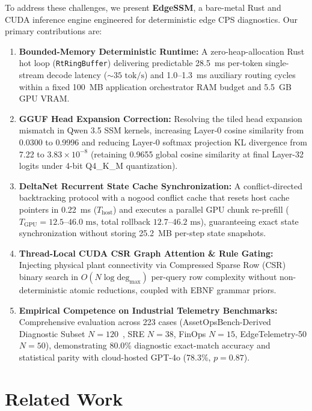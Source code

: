 \documentclass[journal]{IEEEtran}
\begin{document}
To address these challenges, we present \textbf{EdgeSSM}, a bare-metal Rust and CUDA inference engine engineered for deterministic edge CPS diagnostics. Our primary contributions are:
\begin{enumerate}
    \item \textbf{Bounded-Memory Deterministic Runtime:} A zero-heap-allocation Rust hot loop (\texttt{RtRingBuffer}) delivering predictable 28.5~ms per-token single-stream decode latency ($\sim 35\text{ tok/s}$) and 1.0--1.3~ms auxiliary routing cycles within a fixed 100~MB application orchestrator RAM budget and 5.5~GB GPU VRAM.
    \item \textbf{GGUF Head Expansion Correction:} Resolving the tiled head expansion mismatch in Qwen 3.5 SSM kernels, increasing Layer-0 cosine similarity from 0.0300 to 0.9996 and reducing Layer-0 softmax projection KL divergence from 7.22 to $3.83 \times 10^{-8}$ (retaining 0.9655 global cosine similarity at final Layer-32 logits under 4-bit Q4\_K\_M quantization).
    \item \textbf{DeltaNet Recurrent State Cache Synchronization:} A conflict-directed backtracking protocol with a nogood conflict cache that resets host cache pointers in 0.22~ms ($T_{\text{host}}$) and executes a parallel GPU chunk re-prefill ($T_{\text{GPU}} = 12.5\text{--}46.0\text{ ms}$, total rollback $12.7\text{--}46.2\text{ ms}$), guaranteeing exact state synchronization without storing 25.2~MB per-step state snapshots.
    \item \textbf{Thread-Local CUDA CSR Graph Attention \& Rule Gating:} Injecting physical plant connectivity via Compressed Sparse Row (CSR) binary search in $O(N \log \text{deg}_{\max})$ per-query row complexity without non-deterministic atomic reductions, coupled with EBNF grammar priors.
    \item \textbf{Empirical Competence on Industrial Telemetry Benchmarks:} Comprehensive evaluation across 223 cases (AssetOpsBench-Derived Diagnostic Subset $N=120$~\cite{patel2025assetops}, SRE $N=38$, FinOps $N=15$, EdgeTelemetry-50 $N=50$), demonstrating 80.0\% diagnostic exact-match accuracy and statistical parity with cloud-hosted GPT-4o (78.3\%, $p=0.87$).
\end{enumerate}

\section{Related Work}
\end{document}
